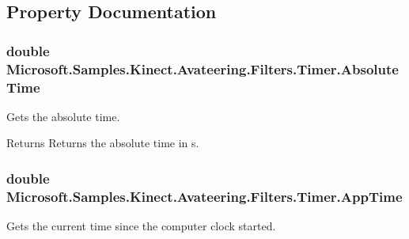 \subsection{Property Documentation}
\hypertarget{class_microsoft_1_1_samples_1_1_kinect_1_1_avateering_1_1_filters_1_1_timer_adec0c50e5672b30b1ff76376e8afd3c8}{
\subsubsection[{Absolute\+Time}]{\setlength{\rightskip}{0pt plus 5cm}double Microsoft.\+Samples.\+Kinect.\+Avateering.\+Filters.\+Timer.\+Absolute\+Time\hspace{0.3cm}{\ttfamily [get]}}}\label{class_microsoft_1_1_samples_1_1_kinect_1_1_avateering_1_1_filters_1_1_timer_adec0c50e5672b30b1ff76376e8afd3c8}


Gets the absolute time. 

\begin{DoxyReturn}{Returns}
Returns the absolute time in s.
\end{DoxyReturn}
\hypertarget{class_microsoft_1_1_samples_1_1_kinect_1_1_avateering_1_1_filters_1_1_timer_a91863829bd1c44609689762d27fef591}{
\subsubsection[{App\+Time}]{\setlength{\rightskip}{0pt plus 5cm}double Microsoft.\+Samples.\+Kinect.\+Avateering.\+Filters.\+Timer.\+App\+Time\hspace{0.3cm}{\ttfamily [get]}}}\label{class_microsoft_1_1_samples_1_1_kinect_1_1_avateering_1_1_filters_1_1_timer_a91863829bd1c44609689762d27fef591}


Gets the current time since the computer clock started. 

